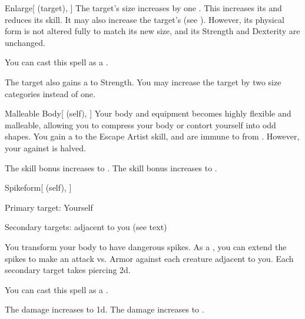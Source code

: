 \lowercase{\hypertarget{spell:Enlarge}{}}\label{spell:Enlarge}
\begin{attuneability}[Rank 4]{\hypertarget{spell:Enlarge}{Enlarge}}[ (target), ]
The target's size increases by one .
This increases its  and reduces its  skill.
It may also increase the target's  (see ).
However, its physical form is not altered fully to match its new size, and its Strength and Dexterity are unchanged.

You can cast this spell as a .

\rankline
{} The target also gains a   to Strength.
 You may increase the target by two size categories instead of one.
\end{attuneability}
\vspace{0.25em}



\lowercase{\hypertarget{spell:Malleable Body}{}}\label{spell:Malleable Body}
\begin{attuneability}[Rank 4]{\hypertarget{spell:Malleable Body}{Malleable Body}}[ (self), ]
Your body and equipment becomes highly flexible and malleable, allowing you to compress your body or contort yourself into odd shapes.
You gain a   to the Escape Artist skill, and are immune to  from .
However, your  against  is halved.

\rankline
{} The skill bonus increases to .
 The skill bonus increases to .
\end{attuneability}
\vspace{0.25em}



\lowercase{\hypertarget{spell:Spikeform}{}}\label{spell:Spikeform}
\begin{attuneability}[Rank 4]{\hypertarget{spell:Spikeform}{Spikeform}}[ (self), ]

Primary target: Yourself
\par\noindent
Secondary targets:  adjacent to you (see text)

You transform your body to have dangerous spikes.
As a , you can extend the spikes to make an attack vs. Armor against each creature adjacent to you.
\hit Each secondary target takes piercing  \minus2d.

You can cast this spell as a .

\rankline
{} The damage increases to  \minus1d.
 The damage increases to .
\end{attuneability}
\vspace{0.25em}



